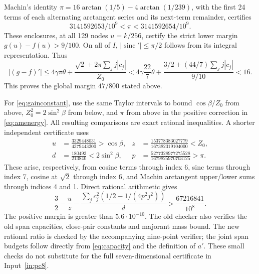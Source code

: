 \documentclass[11pt,a4paper]{article}
\theoremstyle{remark}
\DeclareMathOperator{\sinc}{sinc}
\begin{document}
Machin's identity
$\pi=16\arctan(1/5)-4\arctan(1/239)$, with the first 24 terms
of each alternating arctangent series and its next-term remainder,
certifies
\[
 3141592653/10^9<\pi<3141592654/10^9.
\]
These enclosures, at all 129 nodes $u=k/256$, certify the strict
lower margin $g(u)-f(u)>9/100$.
On all of $I$, $|\sinc'|\le\pi/2$ follows from its integral
representation. Thus
\[
 |(g-f)'|\le4\gamma\pi\theta+
       \frac{\sqrt2+2\pi\sum_jj|c_j|}{Z_0}
 <4\gamma\frac{22}{7}\theta+
       \frac{3/2+(44/7)\sum_jj|c_j|}{9/10}<16.
\]
This proves the global margin $47/800$ stated above.

For \eqref{eq:gainconstant}, use the same Taylor intervals
to bound $\cos\beta/Z_0$ from above, $Z_0^2=2\sin^2\beta$
from below, and $\pi$ from above in the positive correction
in \eqref{eq:amenergy}. All resulting comparisons are exact rational
inequalities. A shorter independent certificate uses
\[
\begin{aligned}
 u&=\frac{3329448031}{4379443200}>\cos\beta,&
 z&=\frac{153778383027779}{167382319104000}<Z_0,\\
 d&=\frac{180493}{213840}<2\sin^2\beta,&
 p&=\frac{5277328977275528}{1679825970703125}>\pi.
\end{aligned}
\]
These arise, respectively, from cosine terms through index 6,
sinc terms through index 7, cosine at $\sqrt2$ through index 6,
and Machin arctangent upper/lower sums through indices 4 and 1.
Direct rational arithmetic gives
\[
 \frac32-\frac uz-
 \frac{\sum_jc_j^2(1/2-1/(4p^2j^2))}{d}
 >\frac{67216841}{10^8}.
\]
The positive margin is greater than $5.6\cdot10^{-10}$.
The old checker also verifies the old span capacities, close-pair
constants and majorant mass bound. The new rational ratio is checked
by the accompanying nine-point verifier; the joint span budgets follow
directly from \eqref{eq:capacity} and the definition of $a'$.
These small checks do not substitute for
the full seven-dimensional certificate in Input~\ref{in:pc8}.
\end{document}
